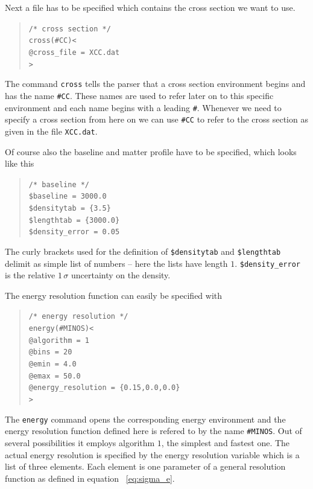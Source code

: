 Next a file has to be specified which contains the cross section we want to 
use.
\begin{quote}
{\tt /* cross section */}\\
{\tt cross(\#CC)<}\\
{\tt \hspace*{3ex}@cross\_file = XCC.dat}\\
{\tt >}
\end{quote}
The command {\tt cross} tells the parser that a cross section environment
begins and has the name {\tt \#CC}. These names are used to refer later on
to this specific environment and each name begins with a leading {\tt \#}.
Whenever we need to specify a cross section from here on we can use {\tt \#CC}
to refer to the cross section as given in the file {\tt XCC.dat}.


Of course also the baseline and matter profile have to be specified, which
 looks like this
\begin{quote}
{\tt /* baseline */}\\
{\tt \$baseline = 3000.0}\\
{\tt \$densitytab = \{3.5\}}\\
{\tt \$lengthtab = \{3000.0\}}\\
{\tt \$density\_error = 0.05}
\end{quote}
The curly brackets used for the definition of {\tt \$densitytab} and
{\tt \$lengthtab} delimit as simple list of numbers -- here the lists
have length $1$. {\tt \$density\_error} is the relative $1\,\sigma$ uncertainty
on the density.

The energy resolution function can easily be specified with
\begin{quote}
{\tt /* energy resolution */}\\
{\tt energy(\#MINOS)<}\\
{\tt \hspace*{3ex}@algorithm = 1}\\
{\tt \hspace*{3ex}@bins = 20}\\
{\tt \hspace*{3ex}@emin = 4.0}\\
{\tt \hspace*{3ex}@emax = 50.0}\\
{\tt \hspace*{3ex}@energy\_resolution = \{0.15,0.0,0.0\}}\\
{\tt >}
\end{quote}
The {\tt energy} command opens the corresponding energy environment and
the energy resolution function defined here is refered to by the name 
{\tt \#MINOS}. Out of several possibilities it employs algorithm $1$,
the simplest and fastest one. The actual energy resolution is specified
by the energy resolution variable which is a list of three elements. Each 
element is one parameter of a general resolution function as defined in 
equation ~\ref{eq:sigma_e}.

